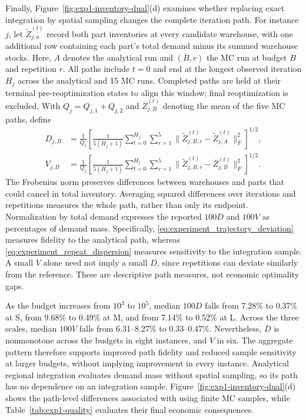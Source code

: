 \documentclass[a4paper,fleqn]{cas-sc}
\theoremstyle{remark}
\theoremstyle{plain}
\begin{document}
Finally, Figure~\ref{fig:exp1-inventory-dual}(d) examines whether replacing exact integration by spatial sampling changes the complete iteration path. For instance $j$, let $\widetilde Z_{j,a}^{(t)}$ record both part inventories at every candidate warehouse, with one additional row containing each part's total demand minus its summed warehouse stocks. Here, $A$ denotes the analytical run and $(B,r)$ the MC run at budget $B$ and repetition $r$. All paths include $t=0$ and end at the longest observed iteration $H_j$ across the analytical and 15 MC runs. Completed paths are held at their terminal pre-reoptimization states to align this window; final reoptimization is excluded. With $Q_j=Q_{j,1}+Q_{j,2}$ and $\overline Z_{j,B}^{(t)}$ denoting the mean of the five MC paths, define
\begin{subequations}\label{eq:experiment_trajectory_metrics}
\begin{align}
 D_{j,B}&=\frac{1}{Q_j}\left[\frac{1}{5(H_j+1)}\sum_{t=0}^{H_j}\sum_{r=1}^{5}\bigl\|\widetilde Z_{j,B,r}^{(t)}-\widetilde Z_{j,A}^{(t)}\bigr\|_F^2\right]^{1/2},\label{eq:experiment_trajectory_deviation}\\
 V_{j,B}&=\frac{1}{Q_j}\left[\frac{1}{5(H_j+1)}\sum_{t=0}^{H_j}\sum_{r=1}^{5}\bigl\|\widetilde Z_{j,B,r}^{(t)}-\overline Z_{j,B}^{(t)}\bigr\|_F^2\right]^{1/2}.\label{eq:experiment_repeat_dispersion}
\end{align}
\end{subequations}
The Frobenius norm preserves differences between warehouses and parts that could cancel in total inventory. Averaging squared differences over iterations and repetitions measures the whole path, rather than only its endpoint. Normalization by total demand expresses the reported $100D$ and $100V$ as percentages of demand mass. Specifically, \eqref{eq:experiment_trajectory_deviation} measures fidelity to the analytical path, whereas \eqref{eq:experiment_repeat_dispersion} measures sensitivity to the integration sample. A small $V$ alone need not imply a small $D$, since repetitions can deviate similarly from the reference. These are descriptive path measures, not economic optimality gaps.

As the budget increases from $10^3$ to $10^5$, median $100D$ falls from 7.28\% to 0.37\% at S, from 9.68\% to 0.49\% at M, and from 7.14\% to 0.52\% at L. Across the three scales, median $100V$ falls from 6.31--8.27\% to 0.33--0.47\%. Nevertheless, $D$ is nonmonotone across the budgets in eight instances, and $V$ in six. The aggregate pattern therefore supports improved path fidelity and reduced sample sensitivity at larger budgets, without implying improvement in every instance. Analytical regional integration evaluates demand mass without spatial sampling, so its path has no dependence on an integration sample. Figure~\ref{fig:exp1-inventory-dual}(d) shows the path-level differences associated with using finite MC samples, while Table~\ref{tab:exp1-quality} evaluates their final economic consequences.
\end{document}
